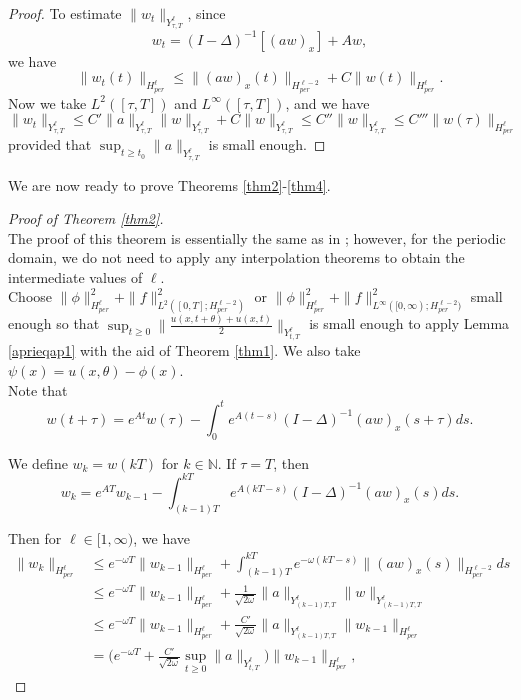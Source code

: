 \documentclass[10pt,a4paper,final]{article}
\numberwithin{equation}{section}
\newcommand{\N}{\mathbb{N}}
\newcommand{\Go}{\omega}
\begin{document}
\begin{proof}
To estimate $\|w_t\|_{Y^{\ell}_{\tau,T}}$, since 
$$w_t=(I-\Delta)^{-1}[(aw)_x]+Aw,$$ 
we have
$$\|w_t(t)\|_{H^{\ell}_{per}}\leq \|(aw)_x(t)\|_{H^{\ell-2}_{per}}+C\|w(t)\|_{H^{\ell}_{per}}.$$
Now we take $L^{2}([\tau,T])$ and $L^{\infty}([\tau,T])$, and we have 
$$\|w_t\|_{Y^{\ell}_{\tau,T}}\leq C'\|a\|_{Y^\ell_{\tau,T}}\|w\|_{Y^{\ell}_{\tau,T}}+C\|w\|_{Y^{\ell}_{\tau,T}}\leq C''\|w\|_{Y^{\ell}_{\tau,T}}\leq C'''\|w(\tau)\|_{H^{\ell}_{per}}$$
provided that $\sup_{t\geq t_0}\|a\|_{Y^{\ell}_{\tau,T}}$ is small enough.
\end{proof}

We are now ready to prove Theorems \ref{thm2}-\ref{thm4}.

\begin{proof}[Proof of Theorem \ref{thm2}]\ \\
The proof of this theorem is essentially the same as in \cite{LW}; however, for the periodic domain, we do not need to apply any interpolation theorems to obtain the intermediate values of $\ell$. \\

Choose $\|\phi\|_{H^{\ell}_{per}}^2+\|f\|_{L^2([0,T];H^{\ell-2}_{per})}^2$  or $\|\phi\|_{H^{\ell}_{per}}^2+\|f\|_{L^\infty([0,\infty);H^{\ell-2}_{per})}^2$  small enough so that $\sup_{t\geq 0}\|\frac{u(x,t+\theta)+u(x,t)}{2}\|_{Y^{\ell}_{t,T}}$ is small enough to apply Lemma \ref{aprieqap1} with the aid of Theorem \ref{thm1}. We also take $\psi(x)=u(x,\theta)-\phi(x)$.\\

Note that
$$w(t+\tau)=e^{At}w(\tau)-\int_{0}^{t}e^{A(t-s)}(I-\Delta)^{-1}(aw)_x(s+\tau)ds.$$

We define $w_k=w(kT)$ for $k\in \N$. If $\tau=T$, then 
$$w_k=e^{AT}w_{k-1}-\int_{(k-1)T}^{kT}e^{A(kT-s)}(I-\Delta)^{-1}(aw)_x(s)ds.$$

Then for $\ell \in [1,\infty)$, we have 
\begin{align*}
    \|w_k\|_{H^{\ell}_{per}}&\leq e^{-\omega T}\|w_{k-1}\|_{H^{\ell}_{per}}+\int_{(k-1)T}^{kT}e^{-\omega (kT-s)}\|(aw)_x(s)\|_{H^{\ell-2}_{per}}ds\\
    &\leq  e^{-\omega T}\|w_{k-1}\|_{H^{\ell}_{per}}+\frac{1}{\sqrt{2\Go}}\|a\|_{Y^{\ell}_{(k-1)T,T}}\|w\|_{Y^{\ell}_{(k-1)T,T}}\\
    &\leq   e^{-\omega T}\|w_{k-1}\|_{H^{\ell}_{per}}+\frac{C'}{\sqrt{2\Go}}\|a\|_{Y^{\ell}_{(k-1)T,T}}\|w_{k-1}\|_{H^{\ell}_{per}} \\
    &= \bigg(e^{-\omega T}+\frac{C'}{\sqrt{2\Go}}\sup_{t\geq 0}\|a\|_{Y^{\ell}_{t,T}}\bigg)\|w_{k-1}\|_{H^{\ell}_{per}},
\end{align*}


\end{proof}
\end{document}
